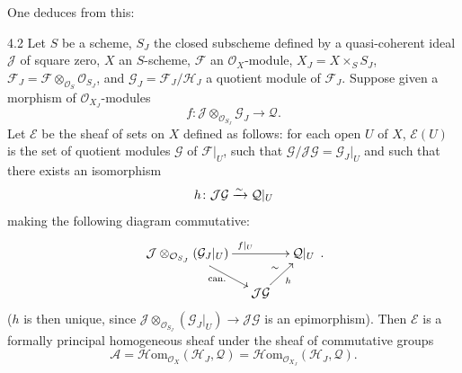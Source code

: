 One deduces from this:

\begin{proposition}{4.2}\label{III.4.2}
{\renewcommand{\thefootnote}{(76)}}%
Let \(S\) be a scheme, \(S_{J}\) the closed subscheme defined by a
quasi-coherent ideal \(\mathcal{J}\) of square zero, \(X\) an \(S\)-scheme,
\(\mathcal{F}\) an \(\mathcal{O}_{X}\)-module,
\(X_{J}=X\times_{S}S_{J}\),
\(\mathcal{F}_{J}=\mathcal{F}\otimes_{\mathcal{O}_{S}}\mathcal{O}_{S_{J}}\),
and \(\mathcal{G}_{J}=\mathcal{F}_{J}/\mathcal{H}_{J}\) a quotient module of
\(\mathcal{F}_{J}\). Suppose given a morphism of
\(\mathcal{O}_{X_{J}}\)-modules
\[
f\colon\mathcal{J}\otimes_{\mathcal{O}_{S_{J}}}\mathcal{G}_{J}
  \longrightarrow\mathcal{Q}.
\]
Let \(\mathcal{E}\) be the sheaf of sets on \(X\) defined as follows: for
each open \(U\) of \(X\), \(\mathcal{E}(U)\) is the set of quotient modules
\(\mathcal{G}\) of \(\mathcal{F}|_{U}\), such that
\(\mathcal{G}/\mathcal{J}\mathcal{G}=\mathcal{G}_{J}|_{U}\) and such that
there exists an isomorphism
\[
h\colon\mathcal{J}\mathcal{G}\xrightarrow{\sim}\mathcal{Q}|_{U}
\]
making the following diagram commutative:
\[
\xymatrix@C=1.2em@R=1.6em{
\mathcal{J}\otimes_{\mathcal{O}_{S_{J}}}(\mathcal{G}_{J}|_{U})
  \ar[rr]^{f|_{U}} \ar[dr]_{\mathrm{can.}}
&& \mathcal{Q}|_{U} \\
& \mathcal{J}\mathcal{G} \ar[ur]_{h}^{\sim}
}\,.
\]
(\(h\) is then unique, since
\(\mathcal{J}\otimes_{\mathcal{O}_{S_{J}}}(\mathcal{G}_{J}|_{U})
  \to\mathcal{J}\mathcal{G}\)
is an epimorphism). Then \(\mathcal{E}\) is a formally principal homogeneous
sheaf under the sheaf of commutative groups
\[
\mathcal{A}
  =\mathcal{H}\mathrm{om}_{\mathcal{O}_{X}}(\mathcal{H}_{J},\mathcal{Q})
  =\mathcal{H}\mathrm{om}_{\mathcal{O}_{X_{J}}}(\mathcal{H}_{J},\mathcal{Q}).
\]
\end{proposition}

